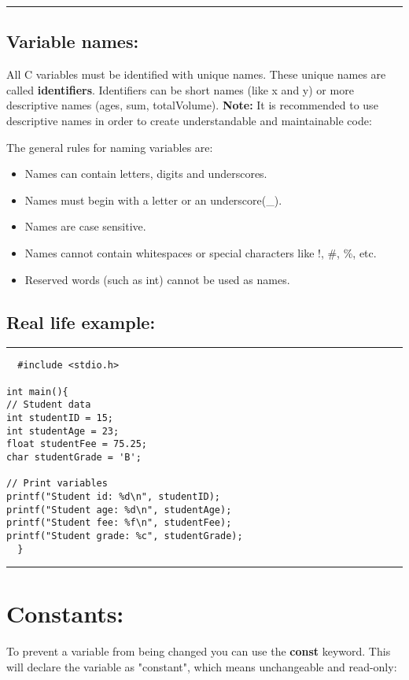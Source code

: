 \documentclass[a4paper]{article}
\begin{document}
\noindent\rule{\textwidth}{0.5pt}

\subsection{Variable names:}
\label{sec:org64e4db9}
All C variables must be identified with unique names.
These unique names are called \textbf{identifiers}.
Identifiers can be short names (like x and y) or more descriptive names (ages,
sum, totalVolume).
\textbf{Note:} It is recommended to use descriptive names in order to create
understandable and maintainable code:

The general rules for naming variables are:
\begin{itemize}
\item Names can contain letters, digits and underscores.
\item Names must begin with a letter or an underscore(\_).
\item Names are case sensitive.
\item Names cannot contain whitespaces or special characters like !, \#, \%, etc.
\item Reserved words (such as int) cannot be used as names.
\end{itemize}

\subsection{Real life example:}
\label{sec:orgdeb1626}
\noindent\rule{\textwidth}{0.5pt}
\begin{verbatim}
  #include <stdio.h>

int main(){
// Student data
int studentID = 15;
int studentAge = 23;
float studentFee = 75.25;
char studentGrade = 'B';

// Print variables
printf("Student id: %d\n", studentID);
printf("Student age: %d\n", studentAge);
printf("Student fee: %f\n", studentFee);
printf("Student grade: %c", studentGrade);
  }
\end{verbatim}

\noindent\rule{\textwidth}{0.5pt}
\clearpage
\section{Constants:}
\label{sec:org8e41afb}
To prevent a variable from being changed you can use the \textbf{const} keyword.
This will declare the variable as "constant", which means unchangeable and
read-only:
\end{document}
